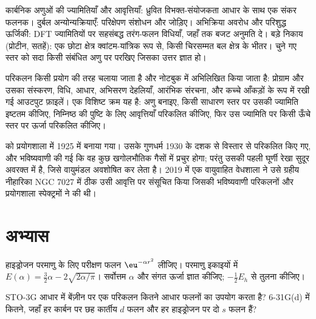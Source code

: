 \begin{method}[सिद्धांत का स्तर चुनना]\label{met:b3:computational-chemistry:choose-level}
कार्बनिक अणुओं की ज्यामितियाँ और आवृत्तियाँ: ध्रुवित विभक्त-संयोजकता आधार के साथ
एक संकर फलनक। दुर्बल अन्योन्यक्रियाएँ: परिक्षेपण
संशोधन और  जोड़िए। अभिक्रिया अवरोध और परिशुद्ध
ऊर्जिकी: DFT ज्यामितियों पर सहसंबद्ध तरंग-फलन विधियाँ, जहाँ तक
बजट अनुमति दे। बड़े निकाय (प्रोटीन, सतहें): एक छोटा क्षेत्र क्वांटम-यांत्रिक
रूप से, किसी चिरसम्मत बल क्षेत्र के भीतर। चुने गए स्तर को सदा किसी
संबंधित अणु पर परखिए जिसका उत्तर ज्ञात हो।
\end{method}

\begin{inthelab}[एक अभिकलनात्मक प्रयोग]
परिकलन किसी प्रयोग की तरह चलाया जाता है और नोटबुक में अभिलिखित किया जाता है:
प्रोग्राम और उसका संस्करण, विधि, आधार, अभिसरण देहलियाँ,
आरंभिक संरचना, और कच्चे आँकड़ों के रूप में रखी गई आउटपुट फ़ाइलें। एक विशिष्ट
क्रम यह है: अणु बनाइए, किसी साधारण स्तर पर उसकी ज्यामिति इष्टतम कीजिए,
निम्निष्ठ की पुष्टि के लिए आवृत्तियाँ परिकलित कीजिए, फिर उस ज्यामिति पर किसी
ऊँचे स्तर पर ऊर्जा परिकलित कीजिए।
\end{inthelab}

\begin{history}
 को प्रयोगशाला में 1925 में बनाया गया। उसके गुणधर्म
1930 के दशक से विस्तार से परिकलित किए गए, और भविष्यवाणी की गई कि वह
कुछ खगोलभौतिक गैसों में प्रचुर होगा; परंतु उसकी पहली घूर्णी रेखा सुदूर
अवरक्त में है, जिसे वायुमंडल अवशोषित कर लेता है। 2019 में एक वायुवाहित वेधशाला ने
उसे ग्रहीय नीहारिका NGC 7027 में ठीक उसी आवृत्ति पर संसूचित किया जिसकी भविष्यवाणी परिकलनों
और प्रयोगशाला स्पेक्ट्रमों ने की थी।
\end{history}

\section{अभ्यास}

\begin{exercise}[$\star$]\label{exo:b3:computational-chemistry:1}
हाइड्रोजन परमाणु के लिए परीक्षण फलन $\eu^{-\alpha r^2}$ लीजिए। परमाणु
इकाइयों में $E(\alpha) = \frac32\alpha - 2\sqrt{2\alpha/\pi}$। सर्वोत्तम $\alpha$ और
संगत ऊर्जा ज्ञात कीजिए; $-\frac12E_h$ से तुलना कीजिए।
\end{exercise}

\begin{exercise}[$\star$]\label{exo:b3:computational-chemistry:2}
STO-3G आधार में बेंज़ीन पर एक परिकलन कितने आधार फलनों का उपयोग करता है?
6-31G(d) में कितने, जहाँ हर कार्बन पर छह कार्तीय $d$ फलन और हर हाइड्रोजन पर दो $s$
फलन हैं?
\end{exercise}

